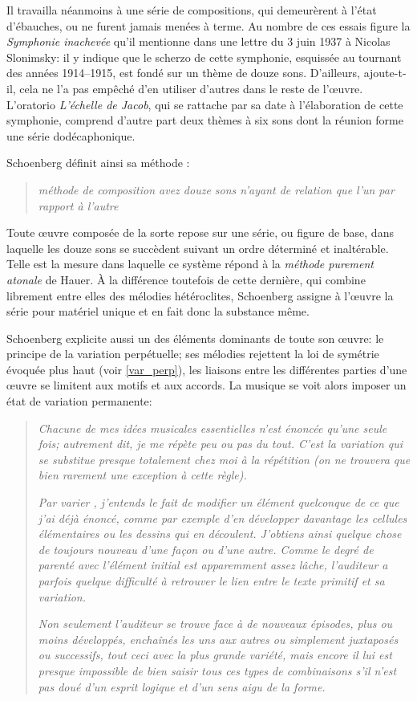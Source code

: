 \documentclass[11pt,a4paper]{scrreprt}
\begin{document}
Il travailla néanmoins à une série de compositions, qui demeurèrent à l'état d'ébauches, ou ne furent jamais menées à terme. Au nombre de ces essais figure la \emph{Symphonie inachevée} qu'il mentionne dans une lettre du 3 juin 1937 à Nicolas Slonimsky: il y indique que le scherzo de cette symphonie, esquissée au tournant des années 1914--1915, est fondé sur un thème de douze sons. D'ailleurs, ajoute-t-il, cela ne l'a pas empêché d'en utiliser d'autres dans le reste de l'\oe{}uvre. L'oratorio \emph{L'échelle de Jacob}, qui se rattache par sa date à l'élaboration de cette symphonie, comprend d'autre part deux thèmes à six sons dont la réunion forme une série dodécaphonique.

Schoenberg définit ainsi sa méthode :
\begin{quote}
\emph{méthode de composition avez douze sons n'ayant de relation que l'un par rapport à l'autre}
\end{quote}
Toute \oe{}uvre composée de la sorte repose sur une série, ou figure de base, dans laquelle les douze sons se succèdent suivant un ordre déterminé et inaltérable. Telle est la mesure dans laquelle ce système répond à la \emph{méthode purement atonale} de Hauer. À la différence toutefois de cette dernière, qui combine librement entre elles des mélodies hétéroclites, Schoenberg assigne à l'\oe{}uvre la série pour matériel unique et en fait donc la substance même.

Schoenberg explicite aussi un des éléments dominants de toute son \oe{}uvre: le principe de la variation perpétuelle; ses mélodies rejettent la loi de symétrie évoquée plus haut  (voir \ref{var_perp}), les liaisons entre les différentes parties d'une \oe{}uvre se limitent aux motifs et aux accords. La musique se voit alors imposer un état de variation permanente:
\begin{quote}
\emph{Chacune de mes idées musicales essentielles n'est énoncée qu'une seule fois; autrement dit, je me répète peu ou pas du tout. C'est la variation qui se substitue presque totalement chez moi à la répétition (on ne trouvera que bien rarement une exception à cette règle).}

\emph{Par \og{} varier \fg{}, j'entends le fait de modifier un élément quelconque de ce que j'ai déjà énoncé, comme par exemple d'en développer davantage les cellules élémentaires ou les dessins qui en découlent. J'obtiens ainsi quelque chose de toujours nouveau d'une façon ou d'une autre. Comme le degré de parenté avec l'élément initial est apparemment assez lâche, l'auditeur a parfois quelque difficulté à retrouver le lien entre le texte primitif et sa variation.}

\emph{Non seulement l'auditeur se trouve face à de nouveaux épisodes, plus ou moins développés, enchaînés les uns aux autres ou simplement juxtaposés ou successifs, tout ceci avec la plus grande variété, mais encore il lui est presque impossible de bien saisir tous ces types de combinaisons s'il n'est pas doué d'un esprit logique et d'un sens aigu de la forme.}
\end{quote}
\end{document}
